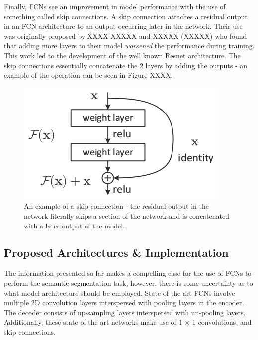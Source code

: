 \documentclass[a4paper]{article}
\begin{document}
Finally, FCNs see an improvement in model performance with the use of something called skip connections. A skip connection attaches a residual output in an FCN architecture to an output occurring later in the network. Their use was originally proposed by XXXX XXXXX and XXXXX (XXXXX) who found that adding more layers to their model \textit{worsened} the performance during training. This work led to the development of the well known Resnet architecture. The skip connections essentially concatenate the 2 layers by adding the outputs - an example of the operation can be seen in Figure XXXX.
\begin{figure}[h]
\centering
\includegraphics[scale=0.5]{skip}
\caption{An example of a skip connection - the residual output in the network literally skips a section of the network and is concatenated with a later output of the model.}
\end{figure}

\subsection{Proposed Architectures \& Implementation}
The information presented so far makes a compelling case for the use of FCNs to perform the semantic segmentation task, however, there is some uncertainty as to what model architecture should be employed. State of the art FCNs involve multiple 2D convolution layers interspersed with pooling layers in the encoder. The decoder consists of up-sampling layers interspersed with un-pooling layers. Additionally, these state of the art networks make use of 1 $\times$ 1 convolutions, and skip connections.


\end{document}
